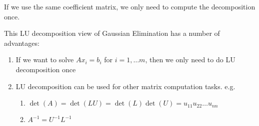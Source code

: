 \documentclass[../main/main.tex]{subfiles}
\begin{document}
\begin{remark}
If we use the same coefficient matrix, we only need to compute the decomposition once.
\end{remark}
This LU decomposition view of Gaussian Elimination has a number of advantages:
\begin{enumerate}
  \item If we want to solve $Ax_{i}= b_{i}$ for $i=1, \ldots m$, then we only need to do LU decomposition once
  \item LU decomposition can be used for other matrix computation tasks. e.g.
\begin{enumerate}
  \item $ \det(A) = \det(LU) = \det(L)\det(U) = u_{11}u_{22}\ldots u_{nn} $
  \item $A^{ -1 } = U^{-1}L^{-1}$
\end{enumerate}

\end{enumerate}
\end{document}

